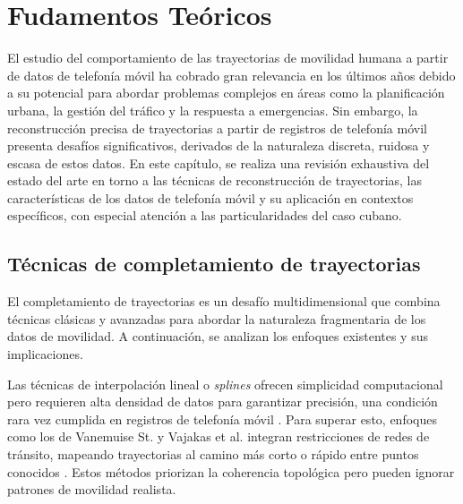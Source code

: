 \chapter{Fudamentos Teóricos}\label{chapter:state-of-the-art}

El estudio del comportamiento de las trayectorias de movilidad humana a partir de datos de telefonía móvil ha cobrado gran relevancia en los últimos años debido a su potencial para abordar problemas complejos en áreas como la planificación urbana, la gestión del tráfico y la respuesta a emergencias. Sin embargo, la reconstrucción precisa de trayectorias a partir de registros de telefonía móvil presenta desafíos significativos, derivados de la naturaleza discreta, ruidosa y escasa de estos datos. En este capítulo, se realiza una revisión exhaustiva del estado del arte en torno a las técnicas de reconstrucción de trayectorias, las características de los datos de telefonía móvil y su aplicación en contextos específicos, con especial atención a las particularidades del caso cubano.

\section{Técnicas de completamiento de trayectorias}

El completamiento de trayectorias es un desafío multidimensional que combina técnicas clásicas y avanzadas para abordar la naturaleza fragmentaria de los datos de movilidad. A continuación, se analizan los enfoques existentes y sus implicaciones.

Las técnicas de interpolación lineal o \textit{splines} ofrecen simplicidad computacional pero requieren alta densidad de datos para garantizar precisión, una condición rara vez cumplida en registros de telefonía móvil \cite{hoteit2014estimating}. Para superar esto, enfoques como los de Vanemuise St. y Vajakas et al. integran restricciones de redes de tránsito, mapeando trayectorias al camino más corto o rápido entre puntos conocidos \cite{st2014reconstructing, vajakas2015trajectory}. Estos métodos priorizan la coherencia topológica pero pueden ignorar patrones de movilidad realista.

